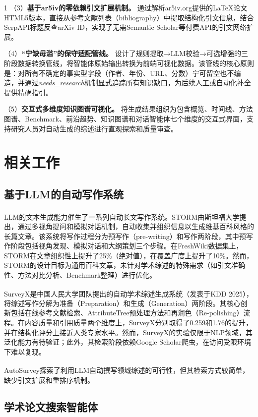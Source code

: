 \documentclass[10.5pt,compsoc,UTF8]{CjC}
\theoremstyle{mystyle}
\newcommand{\upcite}[1]{\textsuperscript{\cite{#1}}}
\begin{document}
\begin{multicols}{1}
（3）\textbf{基于ar5iv的零依赖引文扩展机制。} 通过解析ar5iv.org提供的LaTeX论文HTML5版本，直接从参考文献列表（bibliography）中提取结构化引文信息，结合SerpAPI标题反查arXiv ID，实现了无需Semantic Scholar等付费API的引文网络扩展。

（4）\textbf{``宁缺毋滥''的保守适配管线。} 设计了规则提取→LLM校验→可选增强的三阶段数据转换管线，将智能体原始输出转换为前端可视化数据。该管线的核心原则是：对所有不确定的事实型字段（作者、年份、URL、分数）宁可留空也不编造，并通过\emph{needs\_research}机制显式追踪所有知识缺口，为后续人工或自动化补全提供精确指引。

（5）\textbf{交互式多维度知识图谱可视化。} 将生成结果组织为包含概览、时间线、方法图谱、Benchmark、前沿趋势、知识图谱和对话智能体七个维度的交互式界面，支持研究人员对自动生成的综述进行直观探索和质量审查。

\section{\heiti 相关工作}

\subsection{基于LLM的自动写作系统}

LLM的文本生成能力催生了一系列自动长文写作系统。STORM\upcite{storm2024}由斯坦福大学提出，通过多视角提问和模拟对话机制，自动收集并组织信息以生成维基百科风格的长篇文章。该系统将写作过程分为预写作（pre-writing）和写作两阶段，其中预写作阶段包括视角发现、模拟对话和大纲策划三个步骤。在FreshWiki数据集上，STORM在文章组织性上提升了25\%（绝对值），在覆盖广度上提升了10\%。然而，STORM的设计目标为通用百科文章，未针对学术综述的特殊需求（如引文准确性、方法对比分析、Benchmark整理）进行优化。

SurveyX\upcite{surveyx2025}是中国人民大学团队提出的自动学术综述生成系统（发表于KDD 2025），将综述写作分解为准备（Preparation）和生成（Generation）两阶段。其核心创新包括在线参考文献检索、AttributeTree预处理方法和再润色（Re-polishing）流程。在内容质量和引用质量两个维度上，SurveyX分别取得了0.259和1.76的提升，并在结构化评分上接近人类专家水平。然而，SurveyX的实验仅限于NLP领域，其泛化能力有待验证；此外，其检索阶段依赖Google Scholar爬虫，在访问受限环境下难以复现。

AutoSurvey\upcite{autosurvey2024}探索了利用LLM自动撰写领域综述的可行性，但其检索方式较简单，缺少引文扩展和重排序机制。

\subsection{学术论文搜索智能体}


\end{multicols}
\end{document}
